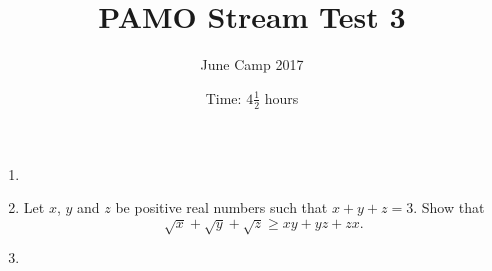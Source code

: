 \documentclass{article}
\title{PAMO Stream Test 3}
\author{June Camp 2017}
\date{Time: $4\frac{1}{2}$ hours}
\begin{document}
 \maketitle

\begin{enumerate}

\item %
	

\item %
	Let $x$, $y$ and $z$ be positive real numbers such that $x+y+z = 3$. Show that \[\sqrt{x}+\sqrt{y}+\sqrt{z} \geq xy +yz +zx.\]

\item %
	

\end{enumerate}
\end{document}
